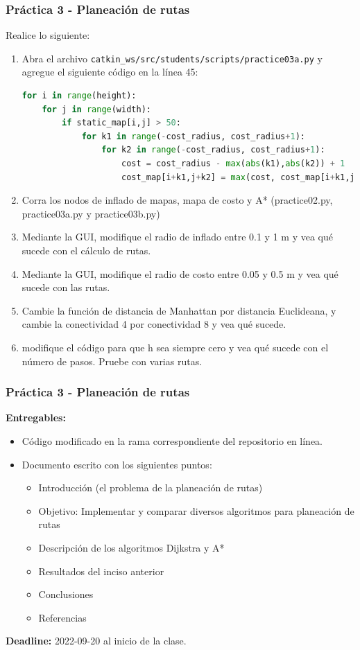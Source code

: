 \documentclass[10pt,spanish,aspectratio=1610]{beamer}
\begin{document}
\begin{frame}[containsverbatim]\frametitle{Práctica 3 - Planeación de rutas}
  Realice lo siguiente:
  \begin{enumerate}
     \item Abra el archivo \texttt{catkin\_ws/src/students/scripts/practice03a.py} y agregue el siguiente código en la línea 45:
  \begin{lstlisting}[language=Python,firstnumber=45]
for i in range(height):
    for j in range(width):
        if static_map[i,j] > 50:
            for k1 in range(-cost_radius, cost_radius+1):
                for k2 in range(-cost_radius, cost_radius+1):
                    cost = cost_radius - max(abs(k1),abs(k2)) + 1
                    cost_map[i+k1,j+k2] = max(cost, cost_map[i+k1,j+k2])
  \end{lstlisting}
  \item Corra los nodos de inflado de mapas, mapa de costo y A* (practice02.py, practice03a.py y practice03b.py)
  \item Mediante la GUI, modifique el radio de inflado entre 0.1 y 1 m y vea qué sucede con el cálculo de rutas.
  \item Mediante la GUI, modifique el radio de costo entre 0.05 y 0.5 m y vea qué sucede con las rutas. 
  \item Cambie la función de distancia de Manhattan por distancia Euclideana, y cambie la conectividad 4 por conectividad 8 y vea qué sucede.
  \item modifique el código para que h sea siempre cero y vea qué sucede con el número de pasos. Pruebe con varias rutas. 
  \end{enumerate}
\end{frame}

\begin{frame}\frametitle{Práctica 3 - Planeación de rutas}
  \textbf{Entregables:}
  \begin{itemize}
  \item Código modificado en la rama correspondiente del repositorio en línea.
  \item Documento escrito con los siguientes puntos:
    \begin{itemize}
    \item Introducción (el problema de la planeación de rutas)
    \item Objetivo: Implementar y comparar diversos algoritmos para planeación de rutas
    \item Descripción de los algoritmos Dijkstra y A*
    \item Resultados del inciso anterior 
    \item Conclusiones
    \item Referencias
    \end{itemize}
  \end{itemize}
  \textbf{Deadline: } 2022-09-20 al inicio de la clase. 
\end{frame}
\end{document}
